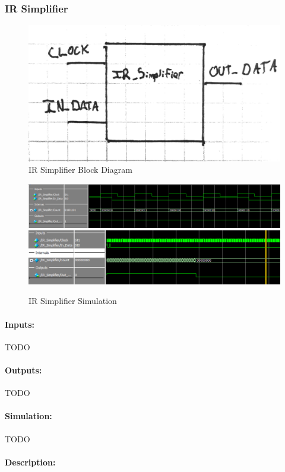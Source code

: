 \documentclass[]{article}
\begin{document}
\subsubsection{IR Simplifier}
\begin{figure}[H]\centering
    \includegraphics[width=0.6\linewidth]{figures/IR_Simplifier_Block.jpg}
    \caption{IR Simplifier Block Diagram}
    \label{fig:irSimplifierBlock}
\end{figure}
\begin{figure}[H]\centering
    \includegraphics[width=\linewidth]{figures/IR_Simplifier_Sim1.png}
    \includegraphics[width=\linewidth]{figures/IR_Simplifier_Sim2.png}
    \caption{IR Simplifier Simulation}
    \label{fig:irSimplifierSim}
\end{figure}
\paragraph{Inputs:} TODO
\paragraph{Outputs:} TODO
\paragraph{Simulation:} TODO
\paragraph{Description:}
\end{document}
